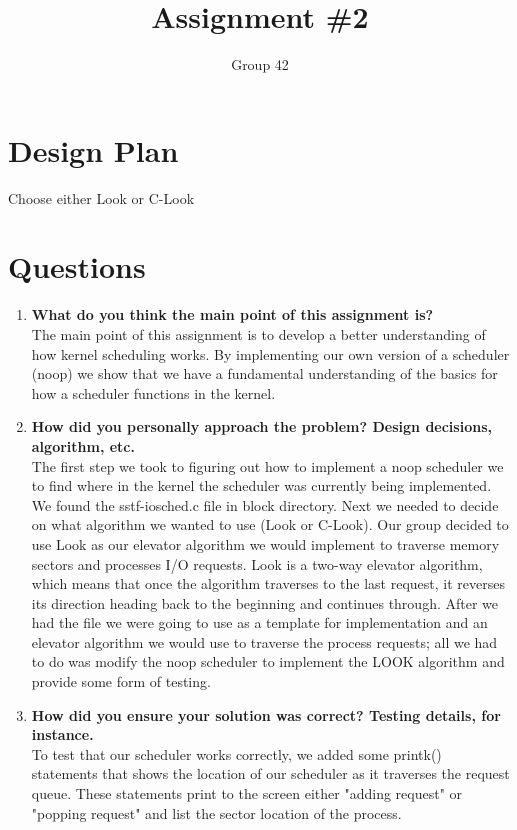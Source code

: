 \documentclass[letterpaper,10pt,notitlepage,fleqn]{article}
\title{Assignment \#2}
\author{Group 42}
\begin{document}
\maketitle
\clearpage


\section{Design Plan}
Choose either Look or C-Look

\section{Questions}
\begin{enumerate}
\item \textbf{What do you think the main point of this assignment is?}
\\	The main point of this assignment is to develop a better understanding of how kernel scheduling works. By implementing our own version of a scheduler (noop) we show that we have a fundamental understanding of the basics for how a scheduler functions in the kernel. 

\item \textbf{How did you personally approach the problem? Design decisions, algorithm, etc.}
\\ The first step we took to figuring out how to implement a noop scheduler we to find where in the kernel the scheduler was currently being implemented. We found the sstf-iosched.c file in block directory. Next we needed to decide on what algorithm we wanted to use (Look or C-Look). Our group decided to use Look as our elevator algorithm we would implement to traverse memory sectors and processes I/O requests. Look is a two-way elevator algorithm, which means that once the algorithm traverses to the last request, it reverses its direction heading back to the beginning and continues through. After we had the file we were going to use as a template for implementation and an elevator algorithm we would use to traverse the process requests; all we had to do was modify the noop scheduler to implement the LOOK algorithm and provide some form of testing. 

\item \textbf{How did you ensure your solution was correct? Testing details, for instance.}
\\ To test that our scheduler works correctly, we added some printk() statements that shows the location of our scheduler as it traverses the request queue. These statements print to the screen either "adding request" or "popping request" and list the sector location of the process.


\end{enumerate}
\end{document}
